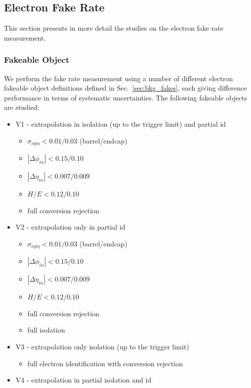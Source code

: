 \subsection{Electron Fake Rate}
This section presents in more detail the studies on the electron fake rate measurement.

\subsubsection{Fakeable Object}
We perform the fake rate measurement using a number of different electron fakeable 
object definitions defined in Sec.~\ref{sec:bkg_fakes}, each giving difference performance 
in terms of systematic uncertainties. The following fakeable objects are studied:

\begin{itemize}
  \item V1 - extrapolation in isolation (up to the trigger limit) and partial id
    \begin{itemize}
      \item $\sigma_{i\eta i\eta} < 0.01/0.03$ (barrel/endcap)
      \item $|\Delta\phi_{in}| < 0.15/0.10$
      \item $|\Delta\eta_{in}| < 0.007/0.009$
      \item $H/E< 0.12/0.10$
      \item full conversion rejection
    \end{itemize}
  \item V2 - extrapolation only in partial id
    \begin{itemize}
      \item $\sigma_{i\eta i\eta} < 0.01/0.03$ (barrel/endcap)
      \item $|\Delta\phi_{in}| < 0.15/0.10$
      \item $|\Delta\eta_{in}| < 0.007/0.009$
      \item $H/E< 0.12/0.10$
      \item full conversion rejection
      \item full isolation
    \end{itemize}
  \item V3 - extrapolation only isolation (up to the trigger limit)
    \begin{itemize}
      \item full electron identification with conversion rejection
    \end{itemize}
  \item V4 - extrapolation in partial isolation and id

\end{itemize}
